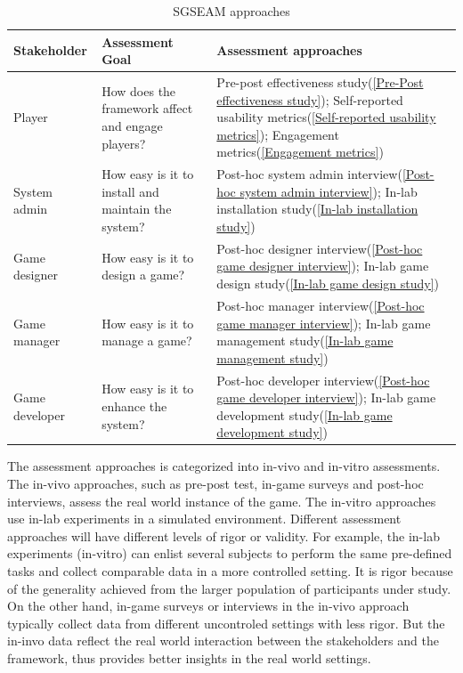 \documentclass[11pt,oneside]{book}
\newcommand\tabhead[1]{\small\textbf{#1}}
\begin{document}
\begin{table}[ht!]
  \centering
  \begin{tabular}{|p{}|p{}|p{}|}
    \hline
    \tabhead{Stakeholder}&
    \tabhead{Assessment Goal}&
    \tabhead{Assessment approaches} \\
    \hline
    Player&
    How does the framework affect and engage players?&
    	Pre-post effectiveness study(\ref{Pre-Post effectiveness study});\newline
	Self-reported usability metrics(\ref{Self-reported usability metrics});\newline
	Engagement metrics(\ref{Engagement metrics}) \\
    \hline
    System admin&
    How easy is it to install and maintain the system?&
    	Post-hoc system admin interview(\ref{Post-hoc system admin interview});\newline
	In-lab installation study(\ref{In-lab installation study}) \\
    \hline
    Game designer&
    How easy is it to design a game?&
    	Post-hoc designer interview(\ref{Post-hoc game designer interview});\newline
	In-lab game design study(\ref{In-lab game design study})\\
    \hline
    Game manager&
    How easy is it to manage a game?&
    	Post-hoc manager interview(\ref{Post-hoc game manager interview});\newline
	In-lab game management study(\ref{In-lab game management study})\\
    \hline
    Game developer&
    How easy is it to enhance the system?&
    	Post-hoc developer interview(\ref{Post-hoc game developer interview});\newline
	In-lab game development study(\ref{In-lab game development study}) \\
    \hline
  \end{tabular}
  \caption{SGSEAM approaches}
  \label{table:approaches}
\end{table}

The assessment approaches is categorized into in-vivo and in-vitro assessments. The in-vivo approaches, 
such as pre-post test, in-game surveys and post-hoc interviews, assess the real world instance of the game. 
The in-vitro approaches use in-lab experiments in a simulated environment. Different assessment
approaches will have different levels of rigor or validity. For example, the in-lab experiments (in-vitro) can 
enlist several subjects to perform the same pre-defined tasks and collect comparable data in a more 
controlled setting. It is rigor because of the generality achieved from the larger population of
participants under study. On the other hand, in-game surveys or interviews in the in-vivo approach typically 
collect data from different uncontroled settings with less rigor. But the in-invo data reflect the real world 
interaction between the stakeholders and the framework, thus provides better insights in the real world settings.
\end{document}
